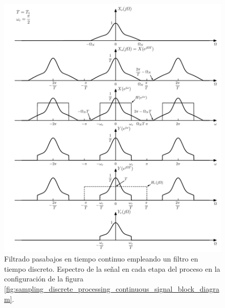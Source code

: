 \documentclass[a4paper]{report}
\begin{document}
\begin{figure}[!htb]
 \begin{center}
 \includegraphics[width=1\textwidth]{figuras/sampling_example_04_03_continuous_low_pass_filter.pdf}
 \caption{\label{fig:sampling_example_04_03_continuous_low_pass_filter} Filtrado pasabajos en tiempo continuo empleando un filtro  en tiempo discreto. Espectro de la señal en cada etapa del proceso en la configuración de la figura \ref{fig:sampling_discrete_processing_continuous_signal_block_diagram}.}
 \end{center}
\end{figure}
\end{document}
